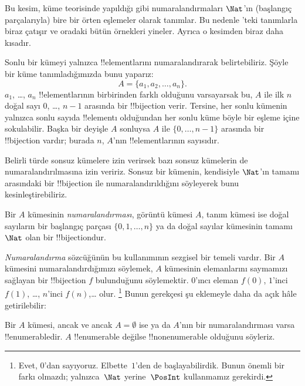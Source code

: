\documentclass[../../../include/open-logic-section]{subfiles}
\begin{document}


\begin{editorial}
  Bu kesim, küme teorisinde yapıldığı gibi numaralandırmaları $\Nat$'ın
  (başlangıç parçalarıyla) bire bir örten eşlemeler olarak tanımlar. Bu
  nedenle 'teki tanımlarla biraz çatışır ve oradaki bütün
  örnekleri yineler. Ayrıca o kesimden biraz daha kısadır.
\end{editorial}

Sonlu bir kümeyi yalnızca !!{element}larını numaralandırarak belirtebiliriz.
Şöyle bir küme tanımladığımızda bunu yaparız:
\[
  A = \{a_1, a_2, \ldots, a_n\}.
\]
$a_1$, \dots, $a_n$ !!{element}larının birbirinden farklı olduğunu
varsayarsak bu, $A$ ile ilk $n$ doğal sayı $0$, \dots, $n-1$ arasında bir
!!{bijection} verir. Tersine, her sonlu kümenin yalnızca sonlu sayıda
!!{element}ı olduğundan her sonlu küme böyle bir eşleme içine sokulabilir.
Başka bir deyişle $A$ sonluysa $A$ ile $\{0,\dots,n-1\}$ arasında bir
!!{bijection} vardır; burada $n$, $A$'nın !!{element}larının sayısıdır.

Belirli türde sonsuz kümelere izin verirsek bazı sonsuz kümelerin de
numaralandırılmasına izin veririz. Sonsuz bir kümenin, kendisiyle $\Nat$'ın
tamamı arasındaki bir !!{bijection} ile numaralandırıldığını söyleyerek bunu
kesinleştirebiliriz.

\begin{defn}
Bir $A$ kümesinin \emph{numaralandırması}, görüntü kümesi $A$, tanım kümesi
  ise doğal sayıların bir başlangıç parçası $\{0,1,\ldots,n\}$ ya da doğal
sayılar kümesinin tamamı $\Nat$ olan bir !!{bijection}dur.
\end{defn}

\begin{explain}
\emph{Numaralandırma} sözcüğünün bu kullanımının sezgisel bir temeli vardır.
Bir $A$ kümesini numaralandırdığımızı söylemek, $A$ kümesinin elemanlarını
saymamızı sağlayan bir !!{bijection} $f$ bulunduğunu söylemektir. $0$'ıncı
eleman $f(0)$, $1$'inci $f(1)$, \ldots, $n$'inci $f(n)$,\ldots{} olur.
\footnote{Evet, $0$'dan sayıyoruz. Elbette~$1$'den de başlayabilirdik. Bunun
önemli bir farkı olmazdı; yalnızca~$\Nat$ yerine~$\PosInt$ kullanmamız
gerekirdi.} Bunun gerekçesi şu eklemeyle daha da açık hâle getirilebilir:
\end{explain}

\begin{defn}
  Bir $A$ kümesi, ancak ve ancak $A=\emptyset$ ise ya da $A$'nın bir
  numaralandırması varsa !!{enumerable}dir. $A$ !!{enumerable} değilse
  !!{nonenumerable} olduğunu söyleriz.
\end{defn}
\end{document}
